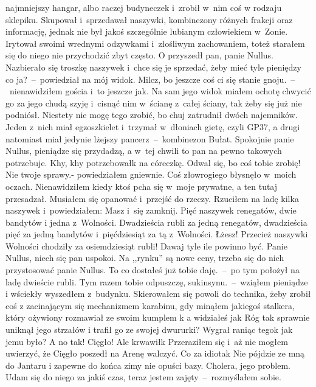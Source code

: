 \documentclass[../MAIN.tex]{subfiles}
\begin{document}
najmniejszy hangar, albo raczej budyneczek i~zrobił w~nim coś w
rodzaju sklepiku. Skupował i~sprzedawał naszywki, kombinezony
różnych frakcji oraz informację, jednak nie był jakoś
szczególnie lubianym człowiekiem w~Zonie. Irytował swoimi
wrednymi odzywkami i~złośliwym zachowaniem, toteż starałem się
do niego nie przychodzić zbyt często.
\sd
\xx O przyszedł pan, panie Nullus. Nazbierało się troszkę
naszywek i~chce się je sprzedać, żeby mieć tyle pieniędzy co
ja?~--~powiedział na mój widok.
\xx Milcz, bo jeszcze coś ci się stanie gnoju.~--~nienawidziłem
gościa i~to jeszcze jak. Na sam jego widok miałem ochotę
chwycić go za jego chudą szyję i~cisnąć nim w~ścianę z~całej
ściany, tak żeby się już nie podniósł. Niestety nie mogę tego
zrobić, bo chuj zatrudnił dwóch najemników. Jeden z~nich miał
egzoszkielet i~trzymał w~dłoniach gietę, czyli GP37, a drugi
natomiast miał jedynie lżejszy pancerz~--~kombinezon Bułat.
\xx Spokojnie panie Nullus, pieniądze się przydadzą, a w~tej
chwili to pan na pewno takowych potrzebuje. Khy, khy
potrzebował\3k na córeczkę.
\xx Odwal się, bo coś tobie zrobię! Nie twoje sprawy.-
powiedziałem gniewnie.
\qd
Coś złowrogiego błysnęło w~moich oczach.
Nienawidziłem kiedy ktoś pcha się w~moje prywatne, a ten tutaj
przesadzał. Musiałem się opanować i~przejść do rzeczy. Rzuciłem
na ladę kilka naszywek i~powiedziałem:
\sd
\xx Masz i~się zamknij. Pięć naszywek renegatów, dwie bandytów
i
jedna z~Wolności.
\xx Dwadzieścia rubli za jedną renegatów, dwadzieścia pięć za
jedną bandytów i~pięćdziesiąt za tą z~Wolności.
\xx Łżesz! Przecież naszywki Wolności chodziły za osiemdziesiąt
rubli! Dawaj tyle ile powinno być.
\xx Panie Nullus, niech się pan uspokoi. Na ,,rynku'' są nowe
ceny,
trzeba się do nich przystosować panie Nullus. To co dostałeś
już tobie daję.~--~po tym położył na ladę dwieście rubli.
\xx Tym razem tobie odpuszczę, sukinsynu.~--~wziąłem pieniądze
i
wściekły wyszedłem z~budynku.
\qd
Skierowałem się powoli do technika, żeby zrobił coś z
zacinającym się mechanizmem karabinu, gdy minąłem jakiegoś
stalkera, który ożywiony rozmawiał ze swoim kumplem
\sd
\xx \3k a widziałeś jak Róg tak sprawnie uniknął jego strzałów
i
trafił go ze swojej dwururki? Wygrał raniąc tego\3k jak jemu
było? A no tak! Cięgło! Ale krwawił\3k
\qd
Przeraziłem się i~aż nie mogłem uwierzyć, że Cięgło poszedł na
Arenę walczyć. Co za idiota\3k Nie pójdzie ze mną do Jantaru i
zapewne do końca zimy nie opuści bazy. Cholera, jego problem.
Udam się do niego za jakiś czas, teraz jestem
zajęty~--~rozmyślałem sobie.
\end{document}
